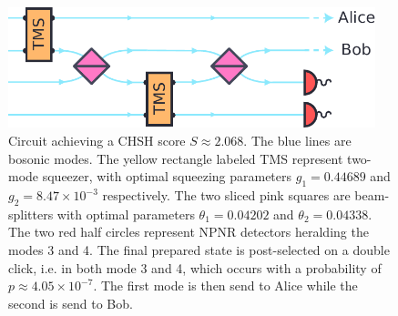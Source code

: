 \begin{figure}[ht]
	\begin{center}
		\includegraphics[width=0.95\textwidth]{chapters/deviceindependent/img/homodyne.pdf}
	\end{center}
	\caption{Circuit achieving a CHSH score $S\approx 2.068$. 
		The blue lines are bosonic modes. 
		The yellow rectangle labeled TMS represent two-mode squeezer, with optimal squeezing parameters $g_1=0.44689$ and $g_2=8.47\times 10^{-3}$ respectively. 
		The two sliced pink squares are beam-splitters with optimal parameters $\theta_1 = 0.04202$ and $\theta_2 = 0.04338$. 
		The two red half circles represent NPNR detectors heralding the modes 3 and 4. 
		The final prepared state is post-selected on a double click, i.e. in both mode 3 and 4, which occurs with a probability of $p\approx 4.05\times10^{-7}$. 
	The first mode is then send to Alice while the second is send to Bob.}
	\label{fig:homodyne}
\end{figure}


